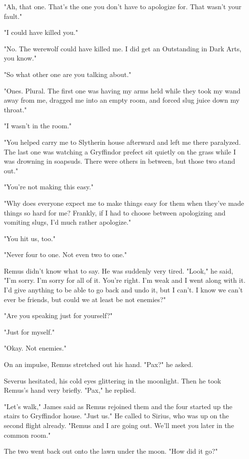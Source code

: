 \documentclass[a4paper,11pt]{article}
\begin{document}
"Ah, that one. That's the one you don't have to apologize for. That wasn't your fault."

"I could have killed you."

"No. The werewolf could have killed me. I did get an Outstanding in Dark Arts, you know."

"So what other one are you talking about."

"Ones. Plural. The first one was having my arms held while they took my wand away from me, dragged me into an empty room, and forced slug juice down my throat."

"I wasn't in the room."

"You helped carry me to Slytherin house afterward and left me there paralyzed. The last one was watching a Gryffindor prefect sit quietly on the grass while I was drowning in soapsuds. There were others in between, but those two stand out."

"You're not making this easy."

"Why does everyone expect me to make things easy for them when they've made things so hard for me? Frankly, if I had to choose between apologizing and vomiting slugs, I'd much rather apologize."

"You hit us, too."

"Never four to one. Not even two to one."

Remus didn't know what to say. He was suddenly very tired. "Look," he said, "I'm sorry. I'm sorry for all of it. You're right. I'm weak and I went along with it. I'd give anything to be able to go back and undo it, but I can't. I know we can't ever be friends, but could we at least be not enemies?"

"Are you speaking just for yourself?"

"Just for myself."

"Okay. Not enemies."

On an impulse, Remus stretched out his hand. "Pax?" he asked.

Severus hesitated, his cold eyes glittering in the moonlight. Then he took Remus's hand very briefly. "Pax," he replied.

"Let's walk," James said as Remus rejoined them and the four started up the stairs to Gryffindor house. "Just us." He called to Sirius, who was up on the second flight already. "Remus and I are going out. We'll meet you later in the common room."

The two went back out onto the lawn under the moon. "How did it go?"
\end{document}
